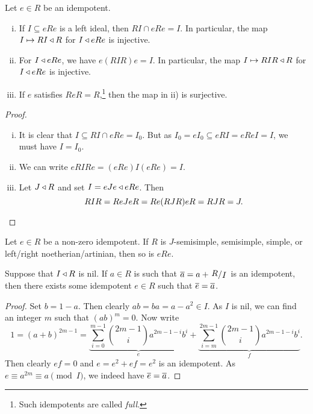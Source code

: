 
\begin{izrek}
Let $e \in R$ be an idempotent.

\begin{enumerate}[i)]
\item If $I \subseteq eRe$ is a left ideal, then $RI \cap eRe = I$.
In particular, the map $I \mapsto RI \triangleleft R$ for $I \triangleleft eRe$ is
injective.
\item For $I \triangleleft eRe$, we have $e(RIR)e = I$. In particular, the
map $I \mapsto RIR \triangleleft R$ for $I \triangleleft eRe$ is injective.
\item If $e$ satisfies $ReR = R$,\footnote{Such idempotents are
called \emph{full}.} then the map in ii) is
surjective.
\end{enumerate}
\end{izrek}

\begin{proof}
\phantom{i}
\begin{enumerate}[i)]
\item It is clear that $I \subseteq RI \cap eRe = I_0$. But as
$I_0 = eI_0 \subseteq eRI = eRe I = I$, we must have $I = I_0$.
\item We can write $eRIRe = (eRe) I (eRe) = I$.
\item Let $J \triangleleft R$ and set $I = eJe \triangleleft eRe$. Then
\[
RIR = R e J e R = R e (RJR) e R = R J R = J. \qedhere
\]
\end{enumerate}
\end{proof}

\begin{posledica}
Let $e \in R$ be a non-zero idempotent. If $R$ is $J$-semisimple,
semisimple, simple, or left/right noetherian/artinian, then so is
$eRe$.
\end{posledica}

\begin{izrek}
Suppose that $I \triangleleft R$ is nil. If $a \in R$ is such that
$\oline{a} = a + \kvoc{R}{I}$ is an idempotent, then there exists
some idempotent $e \in R$ such that $\overline{e} = \overline{a}$.
\end{izrek}

\begin{proof}
Set $b = 1 - a$. Then clearly $ab = ba = a - a^2 \in I$. As $I$
is nil, we can find an integer $m$ such that $(ab)^m = 0$. Now
write
\[
1 = (a + b)^{2m-1} =
\underbrace{\sum_{i=0}^{m-1} \binom{2m-1}{i} a^{2m-1-i} b^i}_e +
\underbrace{\sum_{i=m}^{2m-1} \binom{2m-1}{i} a^{2m-1-i} b^i}_f.
\]
Then clearly $ef = 0$ and $e = e^2 + ef = e^2$ is an idempotent.
As $e \equiv a^{2m} \equiv a \pmod{I}$, we indeed have
$\overline{e} = \overline{a}$.
\end{proof}

